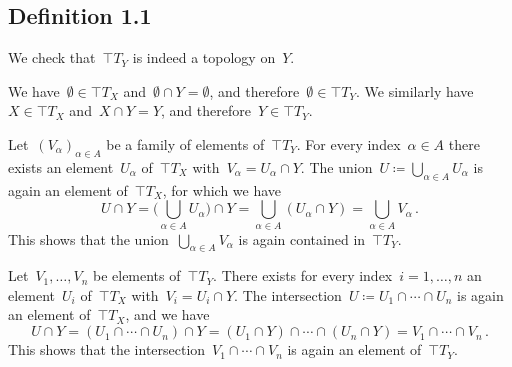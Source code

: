 \subsection{Definition 1.1}

We check that~$\top{T}_Y$ is indeed a topology on~$Y$.

We have~$∅ ∈ \top{T}_X$ and~$∅ ∩ Y = ∅$, and therefore~$∅ ∈ \top{T}_Y$.
We similarly have~$X ∈ \top{T}_X$ and~$X ∩ Y = Y$, and therefore~$Y ∈ \top{T}_Y$.

Let~$(V_α)_{α ∈ A}$ be a family of elements of~$\top{T}_Y$.
For every index~$α ∈ A$ there exists an element~$U_α$ of~$\top{T}_X$ with~$V_α = U_α ∩ Y$.
The union~$U ≔ ⋃_{α ∈ A} U_α$ is again an element of~$\top{T}_X$, for which we have
\[
	U ∩ Y
	=
	\Biggl( ⋃_{α ∈ A} U_α \Biggr) ∩ Y
	=
	⋃_{α ∈ A} {} (U_α ∩ Y)
	=
	⋃_{α ∈ A} V_α \,.
\]
This shows that the union~$⋃_{α ∈ A} V_α$ is again contained in~$\top{T}_Y$.

Let~$V_1, \dotsc, V_n$ be elements of~$\top{T}_Y$.
There exists for every index~$i = 1, \dotsc, n$ an element~$U_i$ of~$\top{T}_X$ with~$V_i = U_i ∩ Y$.
The intersection~$U ≔ U_1 ∩ \dotsb ∩ U_n$ is again an element of~$\top{T}_X$, and we have
\[
	U ∩ Y
	=
	(U_1 ∩ \dotsb ∩ U_n) ∩ Y
	=
	(U_1 ∩ Y) ∩ \dotsb ∩ (U_n ∩ Y)
	=
	V_1 ∩ \dotsb ∩ V_n \,.
\]
This shows that the intersection~$V_1 ∩ \dotsb ∩ V_n$ is again an element of~$\top{T}_Y$.
